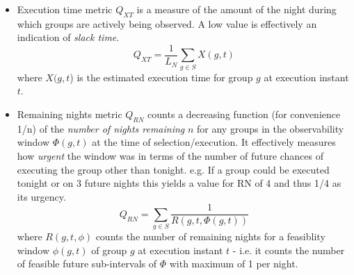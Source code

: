 \begin{itemize}

\item Execution time metric $Q_{XT}$  is a measure of the amount of the night during which groups are actively being observed. A low value is effectively an indication of \emph{slack time}.
\begin{equation}
Q_{XT} = \frac{1}{L_N}\sum_{g \in S}{X(g,t)}
\end{equation}
where $X(g,t$) is the estimated execution time for group $g$ at execution instant $t$.

\item Remaining nights metric $Q_{RN}$  counts a decreasing function (for convenience 1/n) of the \emph{number of nights remaining} $n$ for any groups in the observability window $\Phi(g,t)$ at the time of selection/execution. It effectively measures how \emph{urgent} the window was in terms of the number of future chances of executing 
the group other than tonight. e.g. If a group could be executed tonight or on 3 future nights this yields a value for RN of 4 and thus 1/4 as its urgency.
\begin{equation}
Q_{RN} = \sum_{g \in S}{\frac{1}{R(g,t,\Phi(g,t))}}
\end{equation}
where $R(g,t,\phi)$ counts the number of remaining nights for a feasiblity window $\phi(g,t)$ of group $g$ at execution instant $t$ - i.e. it counts the number of feasible future sub-intervals of $\Phi$ with maximum of 1 per night.


\end{itemize}
